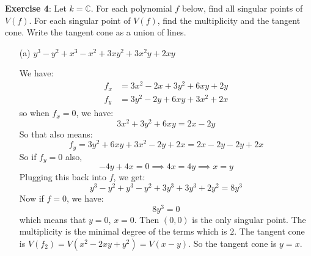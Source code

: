 \documentclass{article}
\begin{document}
\textbf{Exercise 4}: Let $k = \mathbb{C}$. For each polynomial $f$ below, find all singular points of $V(f)$. For each singular point of $V(f)$, find the multiplicity and the tangent cone. Write the tangent cone as a union of lines.
    \begin{itemize}
        \item [(a)] $y^{3} - y^{2} + x^{3} - x^{2} + 3xy^{2} + 3x^{2}y + 2xy$
            \begin{answer}
                We have:
                    \begin{align*}
                        f_{x} &= 3x^{2} - 2x + 3y^{2} + 6xy + 2y \\
                        f_{y} &= 3y^{2} - 2y + 6xy + 3x^{2} + 2x   
                    \end{align*}
                so when $f_{x} = 0$, we have:
                    \begin{equation*}
                        3x^{2} + 3y^{2} + 6xy = 2x - 2y
                    \end{equation*}
                So that also means:
                    \begin{equation*}
                        f_{y} = 3y^{2} + 6xy + 3x^{2} - 2y + 2x = 2x - 2y - 2y + 2x
                    \end{equation*}
                So if $f_{y} = 0$ also, 
                    \begin{equation*}
                        -4y + 4x = 0 \implies 4x = 4y \implies x = y
                    \end{equation*}
                Plugging this back into $f$, we get:
                    \begin{equation*}
                        y^{3} - y^{2} + y^{3} - y^{2} + 3y^{3} + 3y^{3} + 2y^{2} = 8y^{3}
                    \end{equation*}
                Now if $f = 0$, we have:
                    \begin{equation*}
                        8y^{3} = 0
                    \end{equation*}
                which means that $y = 0$, $x = 0$. Then $(0, 0)$ is the only singular point. The multiplicity is the minimal degree of the terms which is $2$. The tangent cone is $V(f_{2}) = V(x^{2} - 2xy + y^{2}) = V(x - y)$. So the tangent cone is $y = x$.
            \end{answer}


\end{itemize}
\end{document}
